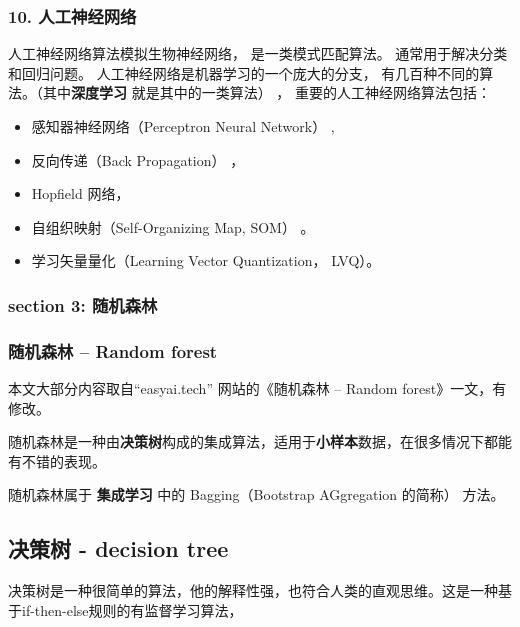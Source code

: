 \documentclass[
]{article}
\begin{document}
\hypertarget{10-ux4ebaux5de5ux795eux7ecfux7f51ux7edc}{%
\subsubsection{10.
人工神经网络}\label{10-ux4ebaux5de5ux795eux7ecfux7f51ux7edc}}

人工神经网络算法模拟生物神经网络， 是一类模式匹配算法。
通常用于解决分类和回归问题。 人工神经网络是机器学习的一个庞大的分支，
有几百种不同的算法。（其中\textbf{深度学习} 就是其中的一类算法） ，
重要的人工神经网络算法包括：

\begin{itemize}
\item
  感知器神经网络（Perceptron Neural Network） ,
\item
  反向传递（Back Propagation） ，
\item
  Hopfield 网络，
\item
  自组织映射（Self-Organizing Map, SOM） 。
\item
  学习矢量量化（Learning Vector Quantization， LVQ）。
\end{itemize}

\hypertarget{section-3-ux968fux673aux68eeux6797}{%
\subsubsection{section 3:
随机森林}\label{section-3-ux968fux673aux68eeux6797}}

\hypertarget{ux968fux673aux68eeux6797----random-forest}{%
\subsubsection{随机森林 -- Random
forest}\label{ux968fux673aux68eeux6797----random-forest}}

本文大部分内容取自``easyai.tech'' 网站的《随机森林 -- Random
forest》一文，有修改。

随机森林是一种由\textbf{决策树}构成的集成算法，适用于\textbf{小样本}数据，在很多情况下都能有不错的表现。

随机森林属于 \textbf{集成学习} 中的 Bagging（Bootstrap AGgregation
的简称） 方法。

\hypertarget{ux51b3ux7b56ux6811---decision-tree}{%
\subsection{决策树 - decision
tree}\label{ux51b3ux7b56ux6811---decision-tree}}

决策树是一种很简单的算法，他的解释性强，也符合人类的直观思维。这是一种基于if-then-else规则的有监督学习算法，
\end{document}
